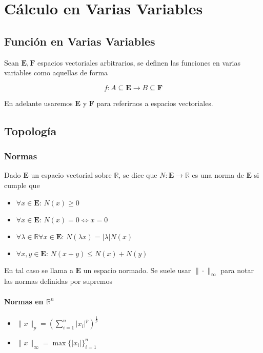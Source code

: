\chapter{Cálculo en Varias Variables}

\section{Función en Varias Variables}

Sean $\mathbf{E}, \mathbf{F}$ espacios vectoriales arbitrarios, se definen las funciones en varias variables como aquellas de forma

\[f: A\subseteq\mathbf{E}\to B\subseteq\mathbf{F}\]

En adelante usaremos $\mathbf{E}$ y $\mathbf{F}$ para referirnos a espacios vectoriales.

\section{Topología}

\subsection{Normas}

Dado $\mathbf{E}$ un espacio vectorial sobre $\mathbb{R}$, se dice que $N:\mathbf{E}\to\mathbb{R}$ es una norma de $\mathbf{E}$ si cumple que

\begin{itemize}
    \item $\forall x\in\mathbf{E}:\, N(x)\geq 0$
    \item $\forall x\in\mathbf{E}:\, N(x)=0\Leftrightarrow
    x=0$
    \item $\forall\lambda\in\mathbb{R}\forall x\in\mathbf{E}:\,
    N(\lambda x) = |\lambda | N(x)$
    \item $\forall x,y\in\mathbf{E}:\, N(x+y)\leq N(x)+N(y)$
\end{itemize}

En tal caso se llama a $\mathbf{E}$ un espacio normado. Se suele usar $\|\cdot\|_\infty$ para notar las normas definidas por supremos

\subsubsection{Normas en $\mathbb{R}^n$}

\begin{itemize}
    \item $\|x\|_p=\left(\sum^n_{i=1}|x_i|^p\right)^{\frac{1}{p}}$
    \item $\|x\|_\infty = \max\{|x_i|\}^n_{i=1}$
\end{itemize}

